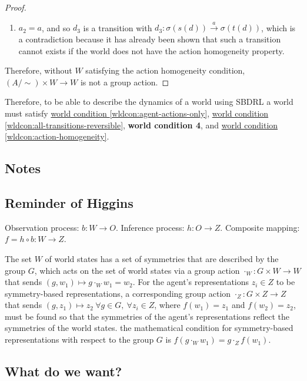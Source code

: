 \begin{proof}
\begin{enumerate}
        \item $a_{2} = a$, and so $d_{3}$ is a transition with $d_{3}: \sigma(s(d)) \xrightarrow{a} \sigma(t(d))$, which is a contradiction because it has already been shown that such a transition cannot exists if the world does not have the action homogeneity property.
    \end{enumerate}


    
    Therefore, without $W$ satisfying the action homogeneity condition, $(A/\sim) \times W \to W$ is not a group action.
\end{proof}

Therefore, to be able to describe the dynamics of a world using SBDRL a world must satisfy \hyperref[wldcon:agent-actions-only]{world condition \ref*{wldcon:agent-actions-only}}, \hyperref[wldcon:all-transitions-reversible]{world condition \ref*{wldcon:all-transitions-reversible}}, \textbf{world condition 4}, and \hyperref[wldcon:action-homogeneity]{world condition \ref*{wldcon:action-homogeneity}}.

\subsection{Notes}

\subsection{Reminder of Higgins}

Observation process: $b: W \to O$.
Inference process: $h: O \to Z$.
Composite mapping: $f = h \circ b: W \to Z$.

The set $W$ of world states has a set of symmetries that are described by the group $G$, which acts on the set of world states via a group action $\cdot_{W}: G \times W \to W$ that sends $(g, w_{1}) \mapsto g \cdot_{W} w_{1} = w_{2}$.
For the agent's representations $z_i \in Z$ to be symmetry-based representations, a corresponding group action $\cdot_{Z}: G \times Z \to Z$ that sends $(g, z_1) \mapsto z_2 \ \forall g \in G, \ \forall z_i \in Z$, where $f(w_1) = z_1$ and $f(w_2) = z_2$, must be found so that the symmetries of the agent's representations reflect the symmetries of the world states.
the mathematical condition for symmetry-based representations with respect to the group $G$ is $f(g \cdot_W w_1) = g \cdot_Z f(w_1)$.

\subsection{What do we want?}

